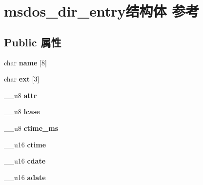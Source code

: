 \hypertarget{structmsdos__dir__entry}{}\section{msdos\+\_\+dir\+\_\+entry结构体 参考}
\label{structmsdos__dir__entry}
\subsection*{Public 属性}
\begin{DoxyCompactItemize}
\item 
\mbox{\label{structmsdos__dir__entry_aa93cd7c3084f9b3b0edaca95f991c0f2}} 
char {\bfseries name} \mbox{[}8\mbox{]}
\item 
\mbox{\label{structmsdos__dir__entry_aecdb7f006147cc98c45507dc462c3e9c}} 
char {\bfseries ext} \mbox{[}3\mbox{]}
\item 
\mbox{\label{structmsdos__dir__entry_a7840d3f8fb9e297ee9ff47a650c195a8}} 
\+\_\+\+\_\+u8 {\bfseries attr}
\item 
\mbox{\label{structmsdos__dir__entry_a66ba9c3dd2c4b41ba6b9709ba5e7a40d}} 
\+\_\+\+\_\+u8 {\bfseries lcase}
\item 
\mbox{\label{structmsdos__dir__entry_aa60ef97cc957a6354cb1bf6e805b537c}} 
\+\_\+\+\_\+u8 {\bfseries ctime\+\_\+ms}
\item 
\mbox{\label{structmsdos__dir__entry_a385f2daa58f98454ef31dd4096253c3f}} 
\+\_\+\+\_\+u16 {\bfseries ctime}
\item 
\mbox{\label{structmsdos__dir__entry_af23a0c51bae20765d1f1a2d345110615}} 
\+\_\+\+\_\+u16 {\bfseries cdate}
\item 
\mbox{\label{structmsdos__dir__entry_ae038c9244cb1e988a4bd17c15dbb082d}} 
\+\_\+\+\_\+u16 {\bfseries adate}
\item 
\mbox{\label{structmsdos__dir__entry_ad1fa96422615b31eb618a3e075c521c3}} 

\end{DoxyCompactItemize}

